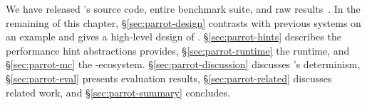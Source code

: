 We have released \parrot's source code, entire benchmark suite, and
raw results~\cite{Parrot:github}. In the remaining of this chapter,
\S\ref{sec:parrot-design} contrasts \parrot with 
previous systems on an example and gives a high-level design of
\parrot. \S\ref{sec:parrot-hints} describes the performance hint abstractions
\parrot provides, \S\ref{sec:parrot-runtime} the \parrot runtime,
and \S\ref{sec:parrot-mc} the
\parrot-\dbug ecosystem. \S\ref{sec:parrot-discussion} discusses \parrot's
determinism, \S\ref{sec:parrot-eval}
presents evaluation results, \S\ref{sec:parrot-related}
discusses related work, and \S\ref{sec:parrot-summary} concludes.
